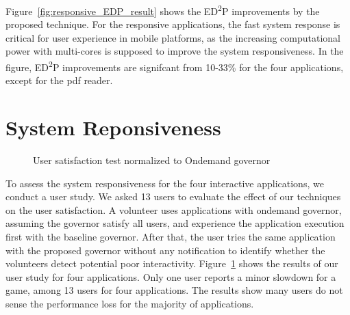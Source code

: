 Figure~\ref{fig:responsive_EDP_result} shows the ED\textsuperscript{2}P improvements by the proposed technique.
For the responsive applications, the fast system response is critical for user experience in mobile platforms,
as the increasing computational power with multi-cores is supposed to improve the system responsiveness.
In the figure, ED\textsuperscript{2}P improvements are signifcant from 10-33\% for the four applications,
except for the pdf reader.

\section{System Reponsiveness}

\begin{figure}[bt]
\begin{center}
\end{center}
\caption{User satisfaction test normalized to Ondemand governor}
\label{fig:interactive_UX_result}
\end{figure}

To assess the system responsiveness for the four interactive applications, we conduct a user study.
We asked 13 users to evaluate the effect of our techniques on the user satisfaction. 
A volunteer uses applications with ondemand governor, assuming the governor satisfy all users, and experience the application execution first 
with the baseline governor. 
After that, the user tries the same application with the proposed governor without any notification 
to identify whether the volunteers detect potential poor interactivity.  
Figure~\ref{fig:interactive_UX_result} shows the results of our user study for four applications. 
Only one user reports a minor slowdown for a game, among 13 users for four applications.
The results show many users do not sense the performance loss for the majority of applications.

\begin{comment}
\begin{figure}[bt]
\begin{center}
\epsfig{figure=graphs/latency_different_headroom_size.eps, width=7cm}
\vspace{-0.2in}
\end{center}
\caption{Latency between user input and frequency raising}
\label{fig:latency_different_headroom_size}
\end{figure}

The second method for system responsiveness is to check whether CPU utilization reaches 99-100\%, meaning the current
frequency setting can be too low for the current CPU load. Such a low frequency setting can degrade the application 
performance, as the application cannot receive enough CPU resource.

\end{comment}
